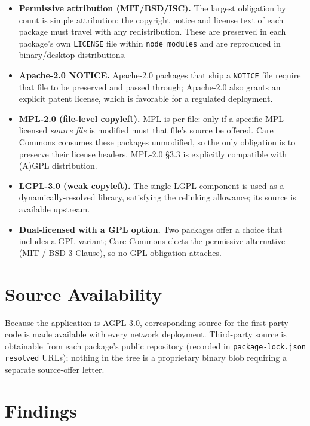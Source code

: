 \begin{itemize}
\item \textbf{Permissive attribution (MIT/BSD/ISC).} The largest obligation
  by count is simple attribution: the copyright notice and license text of
  each package must travel with any redistribution. These are preserved in
  each package's own \texttt{LICENSE} file within \texttt{node\_modules} and
  are reproduced in binary/desktop distributions.
\item \textbf{Apache-2.0 NOTICE.} Apache-2.0 packages that ship a
  \texttt{NOTICE} file require that file to be preserved and passed through;
  Apache-2.0 also grants an explicit patent license, which is favorable for a
  regulated deployment.
\item \textbf{MPL-2.0 (file-level copyleft).} MPL is per-file: only if a
  specific MPL-licensed \emph{source file} is modified must that file's source
  be offered. Care Commons consumes these packages unmodified, so the only
  obligation is to preserve their license headers. MPL-2.0 \S3.3 is explicitly
  compatible with (A)GPL distribution.
\item \textbf{LGPL-3.0 (weak copyleft).} The single LGPL component is used as
  a dynamically-resolved library, satisfying the relinking allowance; its
  source is available upstream.
\item \textbf{Dual-licensed with a GPL option.} Two packages offer a choice
  that includes a GPL variant; Care Commons elects the permissive alternative
  (MIT / BSD-3-Clause), so no GPL obligation attaches.
\end{itemize}

\section{Source Availability}

Because the application is AGPL-3.0, corresponding source for the first-party
code is made available with every network deployment. Third-party source is
obtainable from each package's public repository (recorded in
\texttt{package-lock.json} \texttt{resolved} URLs); nothing in the tree is a
proprietary binary blob requiring a separate source-offer letter.

\section{Findings}

